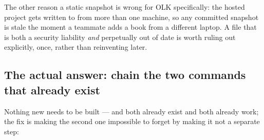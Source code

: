 The other reason a static snapshot is wrong for OLK specifically: the hosted project gets written to from more than one machine, so any committed snapshot is stale the moment a teammate adds a book from a different laptop. A file that is both a security liability \emph{and} perpetually out of date is worth ruling out explicitly, once, rather than reinventing later.

\subsection{The actual answer: chain the two commands that already exist}

Nothing new needs to be built —  and  both already exist and both already work; the fix is making the second one impossible to forget by making it not a separate step:

